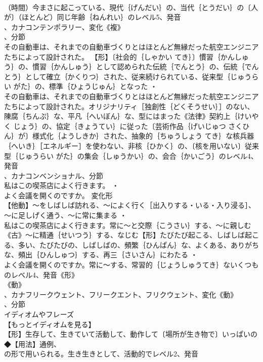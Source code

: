 \documentclass[8pt]{extreport}
\begin{document}
\begin{CJK}{UTF8}{min}
\\	（時間）今まさに起こっている、現代｛げんだい｝の、当代｛とうだい｝の〔人が〕（ほとんど）同じ年齢｛ねんれい｝のレベル5、発音
\\	、カナコンテンポラリー、変化《複》
\\	、分節
\\	その自動車は、それまでの自動車づくりとはほとんど無縁だった航空エンジニアたちによって設計された。		【形】〔社会的｛しゃかい てき｝〕慣習｛かんしゅう｝の、慣習｛かんしゅう｝として認められた伝統｛でんとう｝の、伝統｛でんとう｝として確立｛かくりつ｝された、従来続けられている、従来型｛じゅうらい がた｝の、標準｛ひょうじゅん｝となった ・
\\	その自動車は、それまでの自動車づくりとはほとんど無縁だった航空エンジニアたちによって設計された。オリジナリティ［独創性｛どくそうせい｝］のない、陳腐｛ちんぷ｝な、平凡｛へいぼん｝な、型にはまった《法律》契約上｛けいやく じょう｝の、協定｛きょうてい｝に従った〔芸術作品｛げいじゅつ さくひん｝が〕様式化｛ようしきか｝された、抽象的｛ちゅうしょう てき｝な核兵器｛へいき｝［エネルギー］を使わない、非核｛ひかく｝の、〔核を用いない〕従来型｛じゅうらい がた｝の集会｛しゅうかい｝の、会合｛かいごう｝のレベル4、発音
\\	、カナコンベンショナル、分節
\\	私はこの喫茶店によく行きます。 ・
\\	よく会議を開くのですか。	変化形 
\\	【他動】～をしばしば訪れる、～によく行く［出入りする・いる・入り浸る］、～に足しげく通う、～に常に集まる ・
\\	私はこの喫茶店によく行きます。常に～と交際｛こうさい｝する、～に親しむ《古》～に精通｛せいつう｝する、なじむ【形】たびたび起こる、しばしば起こる、多い、たびたびの、しばしばの、頻繁｛ひんぱん｝な、よくある、ありがちな、頻出｛ひんしゅつ｝する、再三｛さいさん｝にわたる ・
\\	よく会議を開くのですか。常に～する、常習的｛じょうしゅうてき｝ないくつものレベル4、発音《形》
\\	《動》
\\	、カナフリークウェント、フリークエント、フリクウェント、変化《動》
\\	、分節
\\	イディオムやフレーズ 
\\	【もっとイディオムを見る】
\\	【形】生存して、生きていて活動して、動作して〔場所が生き物で〕いっぱいの◆【用法】通例、
\\	の形で用いられる。生き生きとして、活動的でレベル2、発音

\end{CJK}
\end{document}
